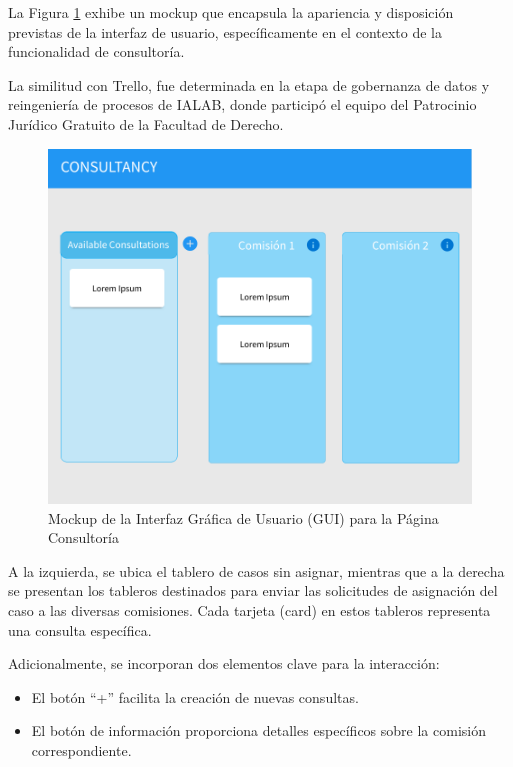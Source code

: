 La Figura \ref{fig:gui-consultancy} exhibe un mockup que encapsula la apariencia y disposición previstas de la interfaz de usuario, específicamente en el contexto de la funcionalidad de consultoría.

La similitud con Trello, fue determinada en la etapa de gobernanza de datos y reingeniería de procesos de IALAB, donde participó el equipo del Patrocinio Jurídico Gratuito de la Facultad de Derecho.

\begin{figure}[h]
\centering
\includegraphics[width=1\linewidth]{fig/GUI-consultancy.png}
\caption{Mockup de la Interfaz Gráfica de Usuario (GUI) para la Página Consultoría}
\label{fig:gui-consultancy}
\end{figure}


A la izquierda, se ubica el tablero de casos sin asignar, mientras que a la derecha se presentan los tableros destinados para enviar las solicitudes de asignación del caso a las diversas comisiones. Cada tarjeta (card) en estos tableros representa una consulta específica.

Adicionalmente, se incorporan dos elementos clave para la interacción:
\begin{itemize}
    \item El botón ``+''  facilita la creación de nuevas consultas.
    \item El botón de información proporciona detalles específicos sobre la comisión correspondiente.
\end{itemize}



